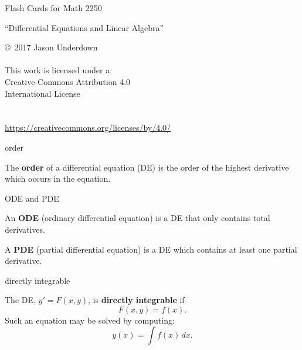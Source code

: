 \documentclass[avery5371,grid]{flashcards}
\newcommand{\defn}[1]{\textbf{#1}}
\begin{document}
\begin{flashcard}[Copying]
  { Flash Cards for Math 2250

    \begin{center}
      ``Differential Equations and Linear Algebra''
    \end{center}
  }

  \copyright\  2017 Jason Underdown \\ \\
  This work is licensed under a \\
  Creative Commons Attribution 4.0 \\
  International License \\
  \ccby \\ \\
  \url{https://creativecommons.org/licenses/by/4.0/}

\end{flashcard}

\begin{flashcard}[Definition]{order}

  The \defn{order} of a differential equation (DE) is the order of the
  highest derivative which occurs in the equation.

\end{flashcard}

\begin{flashcard}[Definition]{ODE and PDE}

  An \defn{ODE} (ordinary differential equation) is a DE that only
  contains total derivatives.
  \bigskip

  A \defn{PDE} (partial differential equation) is a DE which contains
  at least one partial derivative.

\end{flashcard}

\begin{flashcard}[Definition]{directly integrable}

  The DE, $y' = F(x,y)$, is \defn{directly integrable} if
  \[
    F(x,y)=f(x).
  \]
  Such an equation may be solved by computing:
  \[
    y(x) = \int f(x) \, dx.
  \]

\end{flashcard}
\end{document}
